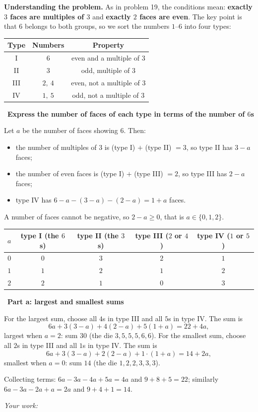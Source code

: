 \documentclass[11pt]{article}
\newif\ifsol \solfalse
\newcommand{\probsol}[1]{%
  \begin{lrbox}{\solmeasure}\begin{minipage}{\dimexpr\linewidth-24pt\relax}#1\end{minipage}\end{lrbox}%
  \ifsol
    \begin{solbox}#1\end{solbox}%
  \else
    \setlength{\solht}{\dimexpr\ht\solmeasure+\dp\solmeasure+0.85cm\relax}%
    \ifdim\solht<1.35cm\setlength{\solht}{1.35cm}\fi
    \ifdim\solht>\StudentMaxWork\setlength{\solht}{\StudentMaxWork}\fi
    \begin{tcolorbox}[colback=white,colframe=Line,boxrule=0.8pt,arc=5pt,
      left=8pt,right=8pt,top=4pt,bottom=4pt,height=\solht]{\footnotesize\color{Slate}\itshape\WorkWord}\end{tcolorbox}%
  \fi}
\newlength{\StudentMaxWork}\setlength{\StudentMaxWork}{7.5cm}
\newcommand{\step}[2]{\par\smallskip\noindent{\bfseries\color{tmBlue!85!black}\StepWord~#1.}\ {\bfseries #2}\par\nopagebreak}
\def\WorkWord{Your work:}
\def\StepWord{Step}
\begin{document}
\probsol{
\textbf{Understanding the problem.} As in problem 19, the conditions mean: \textbf{exactly $3$ faces are multiples of $3$} and
\textbf{exactly $2$ faces are even}. The key point is that $6$ belongs to both groups, so we sort the numbers $1$--$6$ into four types:
\begin{center}\begin{tabular}{|c|c|c|}\hline
Type & Numbers & Property\\\hline
I & $6$ & even and a multiple of $3$\\\hline
II & $3$ & odd, multiple of $3$\\\hline
III & $2,\ 4$ & even, not a multiple of $3$\\\hline
IV & $1,\ 5$ & odd, not a multiple of $3$\\\hline
\end{tabular}\end{center}

\step{1}{Express the number of faces of each type in terms of the number of $6$s}
Let $a$ be the number of faces showing $6$. Then:
\begin{itemize}[leftmargin=1.2em,itemsep=1pt,topsep=2pt]
\item the number of multiples of $3$ is (type I) $+$ (type II) $=3$, so type II has $3-a$ faces;
\item the number of even faces is (type I) $+$ (type III) $=2$, so type III has $2-a$ faces;
\item type IV has $6-a-(3-a)-(2-a)=1+a$ faces.
\end{itemize}
A number of faces cannot be negative, so $2-a\ge0$, that is $a\in\{0,1,2\}$.
\begin{center}\begin{tabular}{|c|c|c|c|c|}\hline
$a$ & type I (the $6$s) & type II (the $3$s) & type III ($2$ or $4$) & type IV ($1$ or $5$)\\\hline
$0$ & $0$ & $3$ & $2$ & $1$\\\hline
$1$ & $1$ & $2$ & $1$ & $2$\\\hline
$2$ & $2$ & $1$ & $0$ & $3$\\\hline
\end{tabular}\end{center}

\step{2}{Part a: largest and smallest sums}
For the largest sum, choose all $4$s in type III and all $5$s in type IV. The sum is
\[6a+3(3-a)+4(2-a)+5(1+a)=22+4a,\]
largest when $a=2$: sum $30$ (the die $3,5,5,5,6,6$).
For the smallest sum, choose all $2$s in type III and all $1$s in type IV. The sum is
\[6a+3(3-a)+2(2-a)+1\cdot(1+a)=14+2a,\]
smallest when $a=0$: sum $14$ (the die $1,2,2,3,3,3$).
\begin{recallbox}Collecting terms: $6a-3a-4a+5a=4a$ and $9+8+5=22$; similarly $6a-3a-2a+a=2a$ and $9+4+1=14$.\end{recallbox}

}
\end{document}
